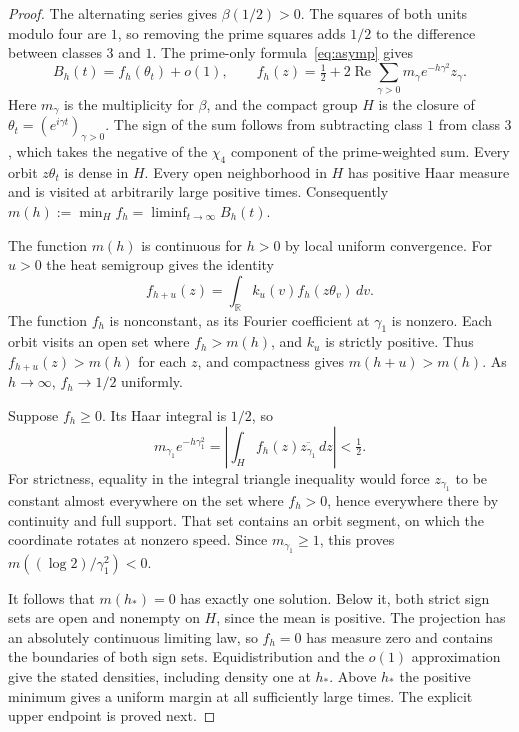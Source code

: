 \begin{proof}
The alternating series gives $\beta(1/2)>0$. The squares of both
units modulo four are $1$, so removing the prime squares adds $1/2$
to the difference between classes $3$ and $1$. The prime-only
formula~\eqref{eq:asymp} gives
\[
 B_h(t)=f_h(\theta_t)+o(1),\qquad
 f_h(z)=\tfrac12+2\operatorname{Re}\sum_{\gamma>0}
                    m_\gamma e^{-h\gamma^2} z_\gamma .
\]
Here $m_\gamma$ is the multiplicity for $\beta$, and the compact
group $H$ is the closure of $\theta_t=(e^{i\gamma t})_{\gamma>0}$.
The sign of the sum follows from subtracting class $1$ from class
$3$, which takes the negative of the $\chi_4$ component of the
prime-weighted sum. Every orbit $z\theta_t$ is dense in $H$.
Every open neighborhood in $H$ has positive Haar measure and is
visited at arbitrarily large positive times. Consequently
$m(h):=\min_H f_h=\liminf_{t\to\infty} B_h(t)$.

The function $m(h)$ is continuous for $h>0$ by local uniform convergence.
For $u>0$ the heat semigroup gives the identity
\[
 f_{h+u}(z)=\int_{\mathbb R} k_u(v)f_h(z\theta_v)\,dv .
\]
The function $f_h$ is nonconstant, as its Fourier coefficient at
$\gamma_1$ is nonzero. Each orbit visits an open set where
$f_h>m(h)$, and $k_u$ is strictly positive. Thus
$f_{h+u}(z)>m(h)$ for each $z$, and compactness gives
$m(h+u)>m(h)$. As $h\to\infty$, $f_h\to1/2$ uniformly.

Suppose $f_h\ge0$. Its Haar integral is $1/2$, so
\[
 m_{\gamma_1}e^{-h\gamma_1^2}
 =\left|\int_H f_h(z)\overline{z_{\gamma_1}}\,dz\right|<\tfrac12.
\]
For strictness, equality in the integral triangle inequality would
force $z_{\gamma_1}$ to be constant almost everywhere on the set
where $f_h>0$, hence everywhere there by continuity and full support.
That set contains an orbit segment, on which the coordinate rotates
at nonzero speed. Since $m_{\gamma_1}\ge1$, this proves
$m((\log2)/\gamma_1^2)<0$.

It follows that $m(h_*)=0$ has exactly one solution. Below it, both
strict sign sets are open and nonempty on $H$, since the mean is
positive. The projection has an absolutely continuous limiting law,
so $f_h=0$ has measure zero and contains the boundaries of both sign sets. Equidistribution
and the $o(1)$ approximation give the stated densities, including
density one at $h_*$. Above $h_*$ the positive minimum gives a uniform
margin at all sufficiently large times. The explicit upper endpoint
is proved next.
\end{proof}

